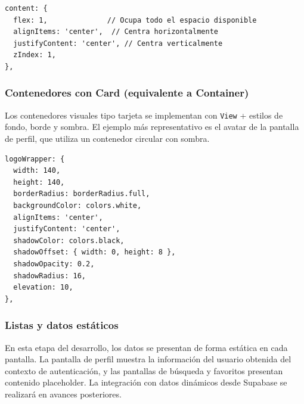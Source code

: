 \begin{lstlisting}
content: {
  flex: 1,              // Ocupa todo el espacio disponible
  alignItems: 'center',  // Centra horizontalmente
  justifyContent: 'center', // Centra verticalmente
  zIndex: 1,
},
\end{lstlisting}

\subsubsection{Contenedores con Card (equivalente a Container)}

Los contenedores visuales tipo tarjeta se implementan con \texttt{View} +
estilos de fondo, borde y sombra. El ejemplo m\'as representativo es el avatar
de la pantalla de perfil, que utiliza un contenedor circular con sombra.

\begin{lstlisting}
logoWrapper: {
  width: 140,
  height: 140,
  borderRadius: borderRadius.full,
  backgroundColor: colors.white,
  alignItems: 'center',
  justifyContent: 'center',
  shadowColor: colors.black,
  shadowOffset: { width: 0, height: 8 },
  shadowOpacity: 0.2,
  shadowRadius: 16,
  elevation: 10,
},
\end{lstlisting}

\subsubsection{Listas y datos est\'aticos}

En esta etapa del desarrollo, los datos se presentan de forma est\'atica en
cada pantalla. La pantalla de perfil muestra la informaci\'on del usuario
obtenida del contexto de autenticaci\'on, y las pantallas de b\'usqueda y
favoritos presentan contenido placeholder. La integraci\'on con datos din\'amicos
desde Supabase se realizar\'a en avances posteriores.
